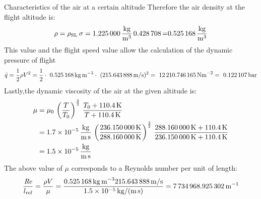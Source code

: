 \documentclass[[12pt,twoside]{book}
\begin{document}
\begin{myExampleX}{Characteristics of the air at a certain altitude}{}
Therefore the air density at the flight altitude is:
\[
\rho = \rho_\text{SL} \, \sigma 
     = \SI[round-precision=3]{\myDensitysealevel}{\si{\frac{kg}{m^{3}}}} \, \SI[round-precision=3]{\myRelativedensity} 
     = \SI[round-precision=3]{\myDensity}{\si{\frac{kg}{m^{3}}}}
\]
%
This value and the flight speed value allow the calculation of the dynamic pressure of flight
\[
\bar{q}=\frac{1}{2} \rho V^{2} =\frac{1}{2}\cdot\ \SI[round-precision=3]{\myDensity}{kg~m^{-3}} \cdot\ (\SI[round-precision=2]{\mySpeedMs}{m/s})^{2} =~\SI[round-precision=2]{\myDynamicpressureNm}{N m^{-2}}=~\SI[round-precision=3]{\myDynamicpressureBar}{bar}
\]
Lastly,the dynamic viscosity of the air at the given  altitude is:
\[
\begin{split}
\mu & {}= \mu_0 \, \left(\frac{T}{T_0}\right)^{\frac{3}{2}} \,                 \frac {T_0 + \SI{110.4}{K}}{T + \SI{110.4}{K}}
    \\
     & {}=\SI[round-precision=1,scientific-notation=true]{\myCone}  {\si {\frac{kg}{m\,s}}}\, \left(\frac{\SI[round-precision=2]{\myTemperatureK}{K}}  {\SI[round-precision=2]{\myTemperaturesealevelK}{K}}
     \right)^{\frac{3}{2}} \,  \frac{\SI[round-precision=2]{\myTemperaturesealevelK}{K} + \SI{110.4}{K}}{\SI[round-precision=2]{\myTemperatureK}{K} + \SI{110.4}{K}}
     \\
     & {}=\SI[round-precision=1,scientific-notation=true]{
     \myDynamicviscosity } {\si {\frac{kg}{m\,s}}}
\end{split}
\]
The above value of $\mu$ corresponds to a Reynolds number per unit of length:
\[
 \frac{\text{\itshape{Re}}}{l_\text{ref}} 
   = \frac{\rho V}{\mu}
   = \frac{
     \SI[round-precision=3]{\myDensity}{kg\,m^{-3}}
       \SI[round-precision=2]{\mySpeedMs}{m/s}
       }{
         \SI[round-precision=2,scientific-notation=true]{\myDynamicviscosity}{kg/(m\,s)}
       }
 = \SI[round-precision=0]{\myReynoldsnumeberperunitoflenght}{m^{-1}}
\]
\end{myExampleX}
\end{document}

